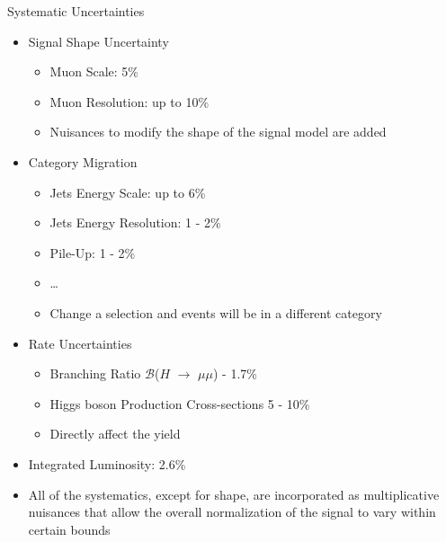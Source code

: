 \documentclass[pdf, 9pt]{beamer}
\begin{document}
  \begin{frame}{Systematic Uncertainties}
    \begin{itemize}
      \item Signal Shape Uncertainty
        \begin{itemize}
          \item Muon Scale: 5\%
          \item Muon Resolution: up to 10\%
          \item Nuisances to modify the shape of the signal model are added
        \end{itemize}
      \item Category Migration
        \begin{itemize}
          \item Jets Energy Scale: up to 6\%
          \item Jets Energy Resolution:  1 - 2\%
          \item Pile-Up: 1 - 2\%
          \item \dots
          \item Change a selection and events will be in a different category
        \end{itemize}
      \item Rate Uncertainties
        \begin{itemize}
          \item Branching Ratio $\mathcal{B}$($H$ $\rightarrow$ $\mu\mu$) - 1.7\%
          \item Higgs boson Production Cross-sections 5 - 10\%
          \item Directly affect the yield
        \end{itemize}
      \item Integrated Luminosity: 2.6\%
      \item \alert{All of the systematics, except for shape, are incorporated as multiplicative nuisances that allow the overall normalization of the signal to vary within certain bounds}
    \end{itemize}
  \end{frame}
\end{document}
